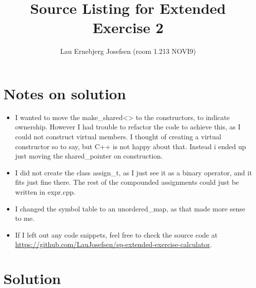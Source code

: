 \documentclass[a4paper]{report}
\title{Source Listing for Extended Exercise 2}
\author{Lau Ernebjerg Josefsen (room 1.213 NOVI9)}
\begin{document}
\maketitle
\section{Notes on solution}
\begin{itemize}
    \item I wanted to move the make\_shared<> to the constructors, to indicate ownership. However I had trouble to refactor the code to achieve this, as I could not construct virtual members. I thought of creating a virtual constructor so to say, but C++ is not happy about that. Instead i ended up just moving the shared\_pointer on construction.
    \item I did not create the class assign\_t, as I just see it as a binary operator, and it fits just fine there. The rest of the compounded assignments could just be written in expr.cpp.
    \item I changed the symbol table to an unordered\_map, as that made more sense to me.
    \item If I left out any code snippets, feel free to check the source code at \url{https://github.com/LauJosefsen/sp-extended-exercise-calculator}.
\end{itemize}
\section{Solution}








\end{document}
